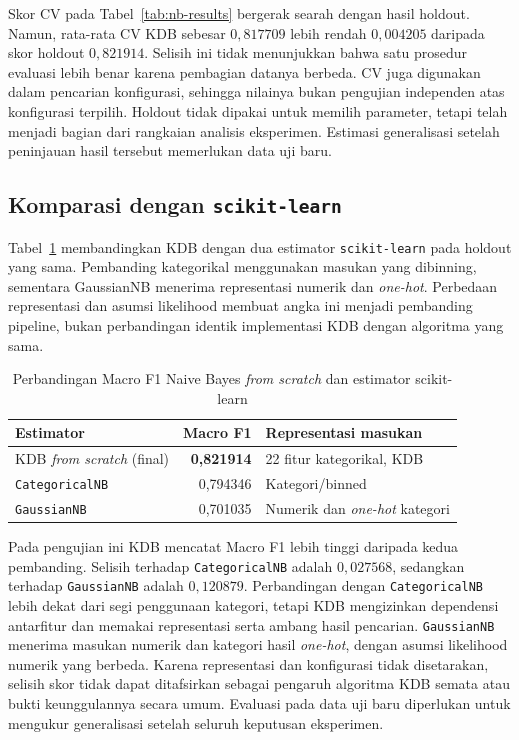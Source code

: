 Skor CV pada Tabel~\ref{tab:nb-results} bergerak searah dengan hasil
holdout. Namun, rata-rata CV KDB sebesar $0{,}817709$ lebih rendah
$0{,}004205$ daripada skor holdout $0{,}821914$. Selisih ini tidak
menunjukkan bahwa satu prosedur evaluasi lebih benar karena pembagian
datanya berbeda. CV juga digunakan dalam pencarian konfigurasi, sehingga
nilainya bukan pengujian independen atas konfigurasi terpilih.
Holdout tidak dipakai untuk memilih parameter, tetapi telah menjadi
bagian dari rangkaian analisis eksperimen. Estimasi generalisasi setelah
peninjauan hasil tersebut memerlukan data uji baru.

\subsection{Komparasi dengan \texttt{scikit-learn}}

Tabel~\ref{tab:nb-sklearn} membandingkan KDB dengan dua estimator
\texttt{scikit-learn} pada holdout yang sama. Pembanding kategorikal
menggunakan masukan yang dibinning, sementara GaussianNB menerima
representasi numerik dan \textit{one-hot}.
Perbedaan representasi dan asumsi likelihood membuat angka ini menjadi
pembanding pipeline, bukan perbandingan identik implementasi KDB dengan
algoritma yang sama.

\begin{table}[H]
    \centering
    \caption{Perbandingan Macro F1 Naive Bayes \textit{from scratch} dan estimator scikit-learn}
    \label{tab:nb-sklearn}
    \begin{tabular}{lrl}
        \hline
        Estimator              & Macro F1          & Representasi masukan                  \\
        \hline
        KDB \textit{from scratch} (final) & \textbf{0,821914} & 22 fitur kategorikal, KDB             \\
        \texttt{CategoricalNB} & 0,794346          & Kategori/binned                       \\
        \texttt{GaussianNB}    & 0,701035          & Numerik dan \textit{one-hot} kategori \\
        \hline
    \end{tabular}
\end{table}

Pada pengujian ini KDB mencatat Macro F1 lebih tinggi daripada kedua
pembanding. Selisih terhadap \texttt{CategoricalNB} adalah $0{,}027568$,
sedangkan terhadap \texttt{GaussianNB} adalah $0{,}120879$. Perbandingan
dengan \texttt{CategoricalNB} lebih dekat dari segi penggunaan kategori,
tetapi KDB mengizinkan dependensi antarfitur dan memakai representasi
serta ambang hasil pencarian. \texttt{GaussianNB} menerima masukan numerik
dan kategori hasil \textit{one-hot}, dengan asumsi likelihood numerik
yang berbeda. Karena representasi dan konfigurasi tidak disetarakan,
selisih skor tidak dapat ditafsirkan sebagai pengaruh algoritma KDB
semata atau bukti keunggulannya secara umum. Evaluasi pada data uji baru
diperlukan untuk mengukur generalisasi setelah seluruh keputusan eksperimen.
